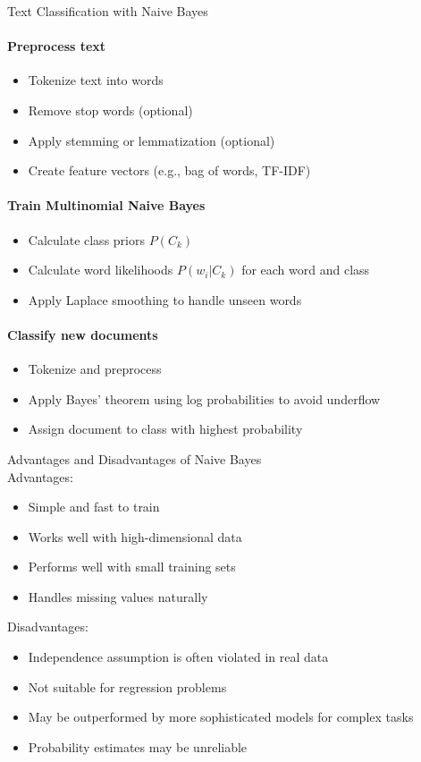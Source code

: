 \begin{KR}{Text Classification with Naive Bayes}\\
\paragraph{Preprocess text}
\begin{itemize}
    \item Tokenize text into words
    \item Remove stop words (optional)
    \item Apply stemming or lemmatization (optional)
    \item Create feature vectors (e.g., bag of words, TF-IDF)
\end{itemize}

\paragraph{Train Multinomial Naive Bayes}
\begin{itemize}
    \item Calculate class priors $P(C_k)$
    \item Calculate word likelihoods $P(w_i|C_k)$ for each word and class
    \item Apply Laplace smoothing to handle unseen words
\end{itemize}

\paragraph{Classify new documents}
\begin{itemize}
    \item Tokenize and preprocess
    \item Apply Bayes' theorem using log probabilities to avoid underflow
    \item Assign document to class with highest probability
\end{itemize}
\end{KR}

\begin{concept}{Advantages and Disadvantages of Naive Bayes}\\
Advantages:
\begin{itemize}
    \item Simple and fast to train
    \item Works well with high-dimensional data
    \item Performs well with small training sets
    \item Handles missing values naturally
\end{itemize}
Disadvantages:
\begin{itemize}
    \item Independence assumption is often violated in real data
    \item Not suitable for regression problems
    \item May be outperformed by more sophisticated models for complex tasks
    \item Probability estimates may be unreliable
\end{itemize}
\end{concept}

